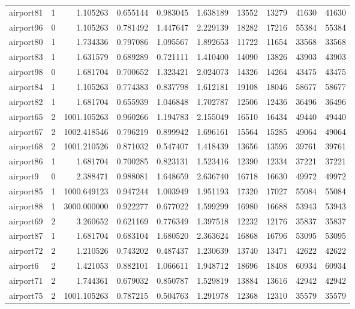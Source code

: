 \begin{longtable}{|l|r|r|r|r|r|r|r|r|r|}
airport81 & 1 & 1.105263 & 0.655144 & 0.983045 & 1.638189 & 13552 & 13279 & 41630 & 41630 \\
airport96 & 0 & 1.105263 & 0.781492 & 1.447647 & 2.229139 & 18282 & 17216 & 55384 & 55384 \\
airport80 & 1 & 1.734336 & 0.797086 & 1.095567 & 1.892653 & 11722 & 11654 & 33568 & 33568 \\
airport83 & 1 & 1.631579 & 0.689289 & 0.721111 & 1.410400 & 14090 & 13826 & 43903 & 43903 \\
airport98 & 0 & 1.681704 & 0.700652 & 1.323421 & 2.024073 & 14326 & 14264 & 43475 & 43475 \\
airport84 & 1 & 1.105263 & 0.774383 & 0.837798 & 1.612181 & 19108 & 18046 & 58677 & 58677 \\
airport82 & 1 & 1.681704 & 0.655939 & 1.046848 & 1.702787 & 12506 & 12436 & 36496 & 36496 \\
airport65 & 2 & 1001.105263 & 0.960266 & 1.194783 & 2.155049 & 16510 & 16434 & 49440 & 49440 \\
airport67 & 2 & 1002.418546 & 0.796219 & 0.899942 & 1.696161 & 15564 & 15285 & 49064 & 49064 \\
airport68 & 2 & 1001.210526 & 0.871032 & 0.547407 & 1.418439 & 13656 & 13596 & 39761 & 39761 \\
airport86 & 1 & 1.681704 & 0.700285 & 0.823131 & 1.523416 & 12390 & 12334 & 37221 & 37221 \\
airport9 & 0 & 2.388471 & 0.988081 & 1.648659 & 2.636740 & 16718 & 16630 & 49972 & 49972 \\
airport85 & 1 & 1000.649123 & 0.947244 & 1.003949 & 1.951193 & 17320 & 17027 & 55084 & 55084 \\
airport88 & 1 & 3000.000000 & 0.922277 & 0.677022 & 1.599299 & 16980 & 16688 & 53943 & 53943 \\
airport69 & 2 & 3.260652 & 0.621169 & 0.776349 & 1.397518 & 12232 & 12176 & 35837 & 35837 \\
airport87 & 1 & 1.681704 & 0.683104 & 1.680520 & 2.363624 & 16868 & 16796 & 53095 & 53095 \\
airport72 & 2 & 1.210526 & 0.743202 & 0.487437 & 1.230639 & 13740 & 13471 & 42622 & 42622 \\
airport6 & 2 & 1.421053 & 0.882101 & 1.066611 & 1.948712 & 18696 & 18408 & 60934 & 60934 \\
airport71 & 2 & 1.744361 & 0.679032 & 0.850787 & 1.529819 & 13884 & 13616 & 42942 & 42942 \\
airport75 & 2 & 1001.105263 & 0.787215 & 0.504763 & 1.291978 & 12368 & 12310 & 35579 & 35579 \\

\end{longtable}

